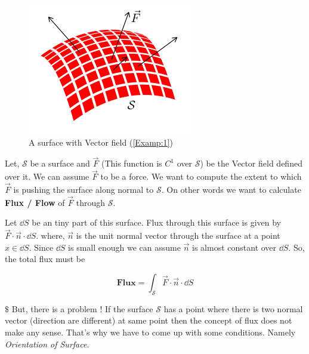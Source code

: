 \documentclass[../Analysis-3]{subfiles}
\begin{document}
\begin{tcolorbox} \label{Examp:1}
     
    \begin{figure}
        \centering
        \includegraphics[width=.78\linewidth]{../figures/lec-26.3.png}
        \caption{A surface with Vector field (\ref{Examp:1})}
    \end{figure}
    
    Let, $\mathcal{S}$ be a surface and $\vec{F}$ (This function is $C^1$ over $\mathcal{S}$) be the Vector field defined over it. We can assume $\vec{F}$ to be a force. We want to compute the extent to which $\vec{F}$ is pushing the surface along normal to $\mathcal{S}$. On other words we want to calculate \textbf{Flux / Flow} of $\vec{F}$ through $\mathcal{S}$. 

    \vspace{0.2cm}

    Let $\dd S$ be an tiny part of  this surface. Flux through this surface is given by $\vec{F}\cdot\vec{n} \cdot \dd S$. where, $\vec{n}$ is the unit normal vector through the surface at a point $x \in \dd S$. Since $\dd S$ is small enough we can assume $\vec{n}$ is almost constant over $\dd S$. So, the total flux must be 

    \[ \textbf{Flux} = \int_{\mathcal{S}} \vec{F}\cdot\vec{n} \cdot \dd S \]

    $\$$ But, there is a problem ! If the surface $\mathcal{S}$ has a point where there is two normal vector (direction are different) at same point then the concept of flux does not make any sense. That's why we have to come up with some conditions. Namely \textit{Orientation of Surface}.

\end{tcolorbox}
\end{document}

